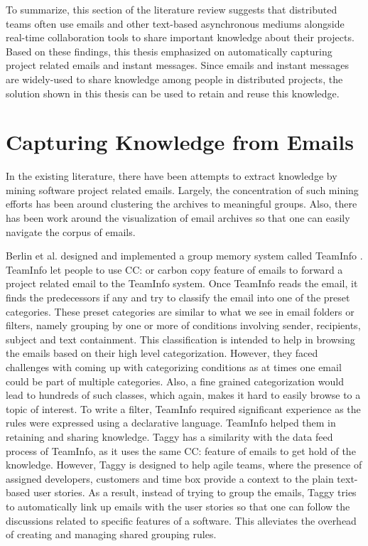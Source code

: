 To summarize, this section of the literature review suggests that distributed teams often use emails and other text-based asynchronous mediums alongside real-time collaboration tools to share important knowledge about their projects. Based on these findings, this thesis emphasized on automatically capturing project related emails and instant messages. Since emails and instant messages are widely-used to share knowledge among people in distributed projects, the solution shown in this thesis can be used to retain and reuse this knowledge.

\section{Capturing Knowledge from Emails}
In the existing literature, there have been attempts to extract knowledge by mining software project related emails. Largely, the concentration of such mining efforts has been around clustering the archives to meaningful groups. Also, there has been work around the visualization of email archives so that one can easily navigate the corpus of emails.

Berlin et al. designed and implemented a group memory system called TeamInfo \cite{where_did_you}. TeamInfo let people to use CC: or carbon copy feature of emails to forward a project related email to the TeamInfo system. Once TeamInfo reads the email, it finds the predecessors if any and try to classify the email into one of the preset categories. These preset categories are similar to what we see in email folders or filters, namely grouping by one or more of conditions involving sender, recipients, subject and text containment. This classification is intended to help in browsing the emails based on their high level categorization. However, they faced challenges with coming up with categorizing conditions as at times one email could be part of multiple categories. Also, a fine grained categorization would lead to hundreds of such classes, which again, makes it hard to easily browse to a topic of interest. To write a filter, TeamInfo required significant experience as the rules were expressed using a declarative language. TeamInfo helped them in retaining and sharing knowledge. Taggy has a similarity with the data feed process of TeamInfo, as it uses the same CC: feature of emails to get hold of the knowledge. However, Taggy is designed to help agile teams, where the presence of assigned developers, customers and time box provide a context to the plain text-based user stories. As a result, instead of trying to group the emails, Taggy tries to automatically link up emails with the user stories so that one can follow the discussions related to specific features of a software. This alleviates the overhead of creating and managing shared grouping rules.

